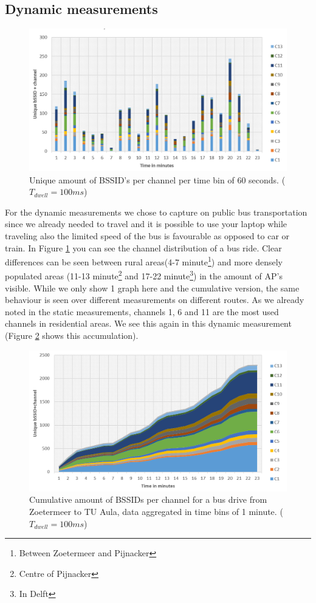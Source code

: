 \documentclass[11pt,a4paper]{article}
\begin{document}
\subsection{Dynamic measurements}
\begin{figure}[h!]
\centering
\includegraphics[scale=0.45]{NoncumuDynamicGraph.png}
\caption{Unique amount of BSSID's per channel per time bin of 60 seconds. ($T_{dwell}=100ms$)}
\label{fig:dynamic_zoetermeer_aula}
\end{figure}
For the dynamic measurements we chose to capture on public bus transportation since we already needed to travel and it is possible to use your laptop while traveling also the limited speed of the bus is favourable as opposed to car or train. In Figure \ref{fig:dynamic_zoetermeer_aula} you can see the channel distribution of a bus ride. Clear differences can be seen between rural areas(4-7 minute\footnote{Between Zoetermeer and Pijnacker}) and more densely populated areas (11-13 minute\footnote{Centre of Pijnacker} and 17-22 minute\footnote{In Delft}) in the amount of AP's visible. While we only show 1 graph here and the cumulative version, the same behaviour is seen over different measurements on different routes. As we already noted in the static measurements, channels 1, 6 and 11 are the most used channels in residential areas. We see this again in this dynamic measurement (Figure \ref{fig:dynamic_zoetermeer_aula_cumu} shows this accumulation).

\begin{figure}[h!]
\centering
\includegraphics[scale=0.45]{ChosenGraphDynamic.png}
\caption{Cumulative amount of BSSIDs per channel for a bus drive from Zoetermeer to TU Aula, data aggregated in time bins of 1 minute. ($T_{dwell}=100ms$)}
\label{fig:dynamic_zoetermeer_aula_cumu}
\end{figure}
\end{document}
